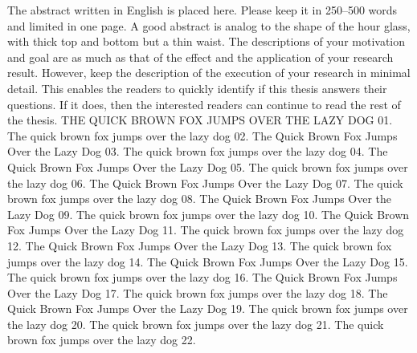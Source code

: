 The abstract written in English is placed here.  Please keep it in 250--500 words and limited in one page. A good abstract is analog to the shape of the hour glass, with thick top and bottom but a thin waist. The descriptions of your motivation and goal are as much as that of the effect and the application of your research result.  However, keep the description of the execution of your research in  minimal detail.  This enables the readers to quickly identify if this thesis answers their questions.  If it does, then the interested readers can continue to read the rest of the thesis. THE QUICK BROWN FOX JUMPS OVER THE LAZY DOG 01.  The quick brown fox jumps over the lazy dog 02.  The Quick Brown Fox Jumps Over the Lazy Dog 03.  The quick brown fox jumps over the lazy dog 04.  The Quick Brown Fox Jumps Over the Lazy Dog 05.  The quick brown fox jumps over the lazy dog 06.  The Quick Brown Fox Jumps Over the Lazy Dog 07.  The quick brown fox jumps over the lazy dog 08.  The Quick Brown Fox Jumps Over the Lazy Dog 09.  The quick brown fox jumps over the lazy dog 10.  The Quick Brown Fox Jumps Over the Lazy Dog 11.  The quick brown fox jumps over the lazy dog 12.  The Quick Brown Fox Jumps Over the Lazy Dog 13.  The quick brown fox jumps over the lazy dog 14.  The Quick Brown Fox Jumps Over the Lazy Dog 15.  The quick brown fox jumps over the lazy dog 16.  The Quick Brown Fox Jumps Over the Lazy Dog 17.  The quick brown fox jumps over the lazy dog 18.  The Quick Brown Fox Jumps Over the Lazy Dog 19.  The quick brown fox jumps over the lazy dog 20.  The quick brown fox jumps over the lazy dog 21.  The quick brown fox jumps over the lazy dog 22.